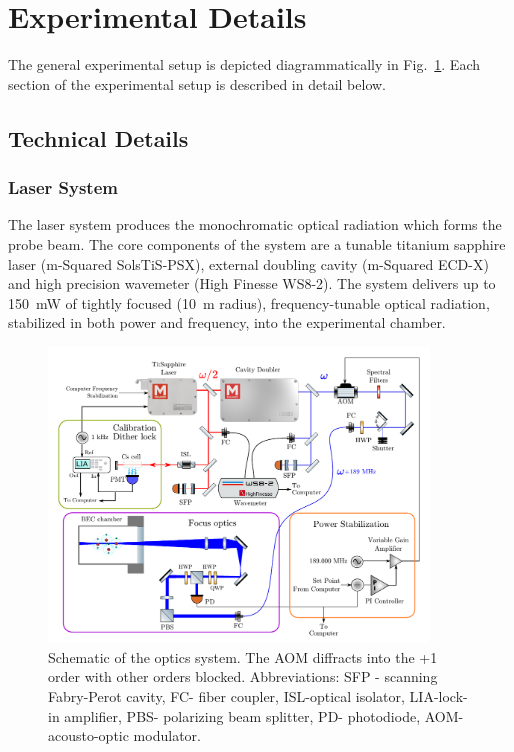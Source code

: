 \documentclass[%
 amsmath,amssymb,
aps,
]{revtex4-2}
\begin{document}


\section{Experimental Details}
The general experimental setup is depicted diagrammatically in Fig.~\ref{fig:exp_diagram}. Each section of the experimental setup is described in detail below.
\subsection{Technical Details}
\subsubsection{Laser System}
The laser system produces the monochromatic optical radiation which forms the probe beam. The core components of the system are a tunable titanium sapphire laser (m-Squared SolsTiS-PSX), external doubling cavity (m-Squared ECD-X) and high precision wavemeter (High Finesse WS8-2). The system delivers up to 150~mW of tightly focused (10~\textmu{}m radius), frequency-tunable optical radiation, stabilized in both power and frequency, into the experimental chamber.

\begin{figure}
    \centering
    \includegraphics[width=0.9\textwidth]{figs/soms/exp_optics_schematic}
    \caption{Schematic of the optics system. The AOM diffracts into the +1 order with other orders blocked. Abbreviations:  SFP - scanning Fabry-Perot cavity, FC- fiber coupler, ISL-optical isolator, LIA-lock-in amplifier, PBS- polarizing beam splitter, PD- photodiode, AOM- acousto-optic modulator. }
    \label{fig:exp_diagram}
\end{figure}
\end{document}
